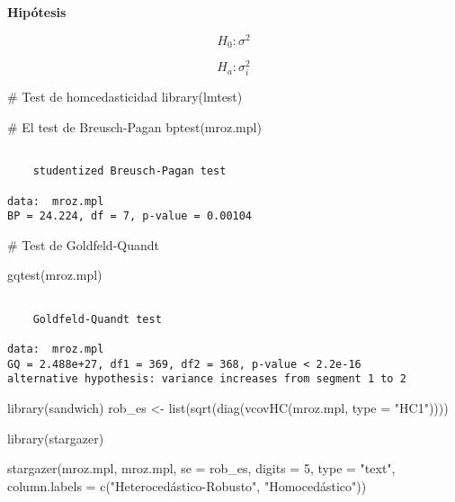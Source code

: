 \documentclass[
  letterpaper,
  DIV=11,
  numbers=noendperiod]{scrreprt}
\newenvironment{Shaded}{\begin{snugshade}}{\end{snugshade}}
\newcommand{\AttributeTok}[1]{\textcolor[rgb]{0.40,0.45,0.13}{#1}}
\newcommand{\CommentTok}[1]{\textcolor[rgb]{0.37,0.37,0.37}{#1}}
\newcommand{\DecValTok}[1]{\textcolor[rgb]{0.68,0.00,0.00}{#1}}
\newcommand{\FunctionTok}[1]{\textcolor[rgb]{0.28,0.35,0.67}{#1}}
\newcommand{\NormalTok}[1]{\textcolor[rgb]{0.00,0.23,0.31}{#1}}
\newcommand{\OtherTok}[1]{\textcolor[rgb]{0.00,0.23,0.31}{#1}}
\newcommand{\StringTok}[1]{\textcolor[rgb]{0.13,0.47,0.30}{#1}}
\begin{document}
\textbf{Hipótesis}

\[H_0:\sigma^2\]

\[H_a:\sigma^2_i\]

\begin{Shaded}
\begin{Highlighting}[]
\CommentTok{\# Test de homcedasticidad}
\FunctionTok{library}\NormalTok{(lmtest)}

\CommentTok{\# El test de Breusch{-}Pagan}
\FunctionTok{bptest}\NormalTok{(mroz.mpl)}
\end{Highlighting}
\end{Shaded}

\begin{verbatim}

    studentized Breusch-Pagan test

data:  mroz.mpl
BP = 24.224, df = 7, p-value = 0.00104
\end{verbatim}

\begin{Shaded}
\begin{Highlighting}[]
\CommentTok{\# Test de Goldfeld{-}Quandt}

\FunctionTok{gqtest}\NormalTok{(mroz.mpl)}
\end{Highlighting}
\end{Shaded}

\begin{verbatim}

    Goldfeld-Quandt test

data:  mroz.mpl
GQ = 2.488e+27, df1 = 369, df2 = 368, p-value < 2.2e-16
alternative hypothesis: variance increases from segment 1 to 2
\end{verbatim}

\begin{Shaded}
\begin{Highlighting}[]
\FunctionTok{library}\NormalTok{(sandwich)}
\NormalTok{rob\_es }\OtherTok{\textless{}{-}} \FunctionTok{list}\NormalTok{(}\FunctionTok{sqrt}\NormalTok{(}\FunctionTok{diag}\NormalTok{(}\FunctionTok{vcovHC}\NormalTok{(mroz.mpl, }\AttributeTok{type =} \StringTok{"HC1"}\NormalTok{))))}

\FunctionTok{library}\NormalTok{(stargazer)}

\FunctionTok{stargazer}\NormalTok{(mroz.mpl, mroz.mpl,}
          \AttributeTok{se =}\NormalTok{ rob\_es,}
          \AttributeTok{digits =} \DecValTok{5}\NormalTok{,}
          \AttributeTok{type =} \StringTok{"text"}\NormalTok{,}
          \AttributeTok{column.labels =} \FunctionTok{c}\NormalTok{(}\StringTok{"Heterocedástico{-}Robusto"}\NormalTok{, }\StringTok{"Homocedástico"}\NormalTok{))}
\end{Highlighting}
\end{Shaded}
\end{document}

